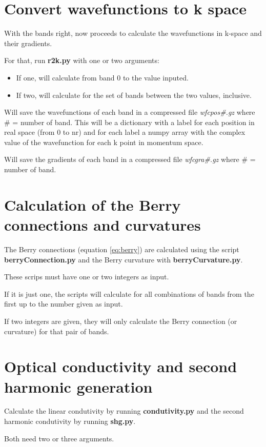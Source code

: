 \documentclass[a4paper,12pt]{report}
\begin{document}
\section{Convert wavefunctions to k space}

With the bands right, now proceeds to calculate the wavefunctions in k-space and their gradients.

For that, run \textbf{r2k.py} with one or two arguments:
\begin{itemize}
 \item If one, will calculate from band 0 to the value inputed.
 \item If two, will calculate for the set of bands between the two values, inclusive.
\end{itemize}

 Will save the wavefunctions of each band in a compressed file \emph{wfcpos\#.gz} where \# = number of band.
 This will be a dictionary with a label for each position in real space (from 0 to nr) and for each label
 a numpy array with the complex value of the wavefunction for each k point in momentum space.

 Will save the gradients of each band in a compressed file \emph{wfcgra\#.gz} where \# = number of band.

\section{Calculation of the Berry connections and curvatures}

The Berry connections (equation \ref{eq:berry}) are calculated using the script \textbf{berryConnection.py}
and the Berry curvature with \textbf{berryCurvature.py}.

These scrips must have one or two integers as input.

If it is just one, the scripts will calculate for all combinations of bands from the first up to the
number given as input.

If two integers are given, they will only calculate the Berry connection (or curvature) for that pair of bands.


\section{Optical conductivity and second harmonic generation}
Calculate the linear condutivity by running \textbf{condutivity.py}
and the second harmonic condutivity by running \textbf{shg.py}.

Both need two or three arguments.
\end{document}
